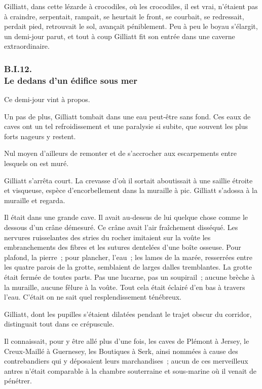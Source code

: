 \documentclass[french,twoside]{book} %
\begin{document}
Gilliatt, dans cette lézarde à crocodiles, où les crocodiles, il est vrai, n’étaient pas à craindre, serpentait, rampait, se heurtait le front, se courbait, se redressait, perdait pied, retrouvait le sol, avançait péniblement. Peu à peu le boyau s’élargit, un demi-jour parut, et tout à coup Gilliatt fit son entrée dans une caverne extraordinaire.
 \subsubsection[{B.I.12. Le dedans d’un édifice sous mer}]{B.I.12. \\
Le dedans d’un édifice sous mer}
\noindent Ce demi-jour vint à propos.\par
Un pas de plus, Gilliatt tombait dans une eau peut-être sans fond. Ces eaux de caves ont un tel refroidissement et une paralysie si subite, que souvent les plus forts nageurs y restent.\par
Nul moyen d’ailleurs de remonter et de s’accrocher aux escarpements entre lesquels on est muré.\par
Gilliatt s’arrêta court. La crevasse d’où il sortait aboutissait à une saillie étroite et visqueuse, espèce d’encorbellement dans la muraille à pic. Gilliatt s’adossa à la muraille et regarda.\par
Il était dans une grande cave. Il avait au-dessus de lui quelque chose comme le dessous d’un crâne démesuré. Ce crâne avait l’air fraîchement disséqué. Les nervures ruisselantes des stries du rocher imitaient sur la voûte les embranchements des fibres et les sutures dentelées d’une boîte osseuse. Pour plafond, la  pierre ; pour plancher, l’eau ; les lames de la marée, resserrées entre les quatre parois de la grotte, semblaient de larges dalles tremblantes. La grotte était fermée de toutes parts. Pas une lucarne, pas un soupirail ; aucune brèche à la muraille, aucune fêlure à la voûte. Tout cela était éclairé d’en bas à travers l’eau. C’était on ne sait quel resplendissement ténébreux.\par
Gilliatt, dont les pupilles s’étaient dilatées pendant le trajet obscur du corridor, distinguait tout dans ce crépuscule.\par
Il connaissait, pour y être allé plus d’une fois, les caves de Plémont à Jersey, le Creux-Maillé à Guernesey, les Boutiques à Serk, ainsi nommées à cause des contrebandiers qui y déposaient leurs marchandises ; aucun de ces merveilleux antres n’était comparable à la chambre souterraine et sous-marine où il venait de pénétrer.\par
\end{document}
